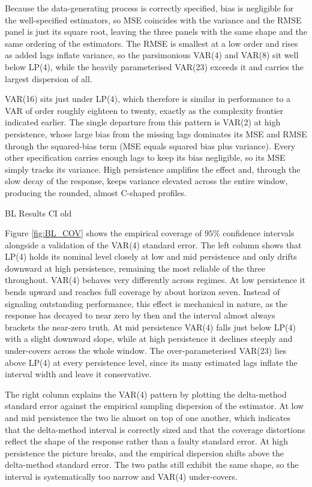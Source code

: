 Because the data-generating process is correctly specified, bias is negligible for the well-specified estimators, so MSE 
coincides with the variance and the RMSE panel is just its square root, leaving the three panels with the same shape 
and the same ordering of the estimators. The RMSE is smallest at a low order and rises as added lags inflate variance, 
so the parsimonious VAR(4) and VAR(8) sit well below LP(4), while the heavily parameterised VAR(23) exceeds it and 
carries the largest dispersion of all.

VAR(16) sits just under LP(4), which therefore is similar in performance to a VAR of order roughly eighteen to twenty, 
exactly as the complexity frontier indicated earlier. The single departure from this pattern is VAR(2) at high 
persistence, whose large bias from the missing lags dominates its MSE and RMSE through the squared-bias term (MSE 
equals squared bias plus variance). Every other specification carries enough lags to keep its bias negligible, so 
its MSE simply tracks its variance. High persistence amplifies the effect and, through the slow decay of the response, 
keeps variance elevated across the entire window, producing the rounded, almost C-shaped profiles.

BL Results CI old

Figure \ref{fig:BL_COV} shows the empirical coverage of $95\%$ confidence intervals alongside a 
validation of the VAR(4) standard error. The left column shows that LP(4) holds its nominal level closely 
at low and mid persistence and only drifts downward at high persistence, remaining the most reliable of the 
three throughout. VAR(4) behaves very differently across regimes. At low persistence it bends upward and 
reaches full coverage by about horizon seven. Instead of signaling outstanding performance, this effect is mechanical in nature, 
as the response has decayed to near zero by then and the interval almost always brackets the near-zero truth. 
At mid persistence VAR(4) falls just below LP(4) with a slight downward slope, while at high persistence it 
declines steeply and under-covers across the whole window. The over-parameterised VAR(23) lies above LP(4) 
at every persistence level, since its many estimated lags inflate the interval width and leave it conservative.

The right column explains the VAR(4) pattern by plotting the delta-method standard error against the empirical 
sampling dispersion of the estimator. At low and mid persistence the two lie almost on top of one another, 
which indicates that the delta-method interval is correctly sized and that the coverage distortions reflect the 
shape of the response rather than a faulty standard error. At high persistence the picture breaks, and the 
empirical dispersion shifts above the delta-method standard error. The two paths still exhibit the same shape, 
so the interval is systematically too narrow and VAR(4) under-covers. 


